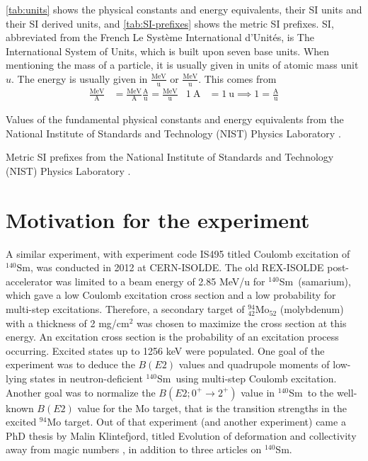 \documentclass[twoside,english]{uiofysmaster/uiofysmaster}
\newcommand{\Sm}{$^{140}$Sm} %
\let\orgautoref\autoref
\renewcommand{\autoref}
        {%
		 \def\sectionautorefname{Section}%
		 \def\subsectionautorefname{Section}%
		 \def\subsubsectionautorefname{Section}%
		 \def\chapterautorefname{Chapter}%
          \orgautoref}
\begin{document}
\autoref{tab:units} shows the physical constants and energy equivalents, their SI units and their SI derived units, and
\autoref{tab:SI-prefixes} shows the metric SI prefixes.
SI, abbreviated from the French Le Syst{\`{e}}me International d'Unit{\'{e}}s, is The International System of Units, which is built upon seven base units.
When mentioning the mass of a particle, it is usually given in units of atomic mass unit $u$.
The energy is usually given in $\frac{\text{MeV}}{\text{u}}$ or $\frac{\text{MeV}}{\text{u}}$.
This comes from 
\begin{align}
	\frac{\text{MeV}}{\text{A}} &= \frac{\text{MeV}}{\text{A}}  \frac{\text{A}}{\text{u}} = \frac{\text{MeV}}{\text{u}}  &  1 ~\text{A} &= 1 ~\text{u} \implies 1 = \frac{\text{A}}{\text{u}}
\end{align}

\begin{table}[htb] 
    \centering 
    \caption{Values of the fundamental physical constants and energy equivalents from the National Institute of Standards and Technology (NIST) Physics Laboratory \cite{units}.}
	
	\label{tab:units}
\end{table}

\begin{table}[htb] 
    \centering 
    \caption{Metric SI prefixes from the National Institute of Standards and Technology (NIST) Physics Laboratory \cite{units}.}
	
	\label{tab:SI-prefixes}
\end{table}


\section{Motivation for the experiment}

A similar experiment, with experiment code IS495 titled Coulomb excitation of \Sm, was conducted in 2012 at CERN-ISOLDE.
The old REX-ISOLDE post-accelerator was limited to a beam energy of 2.85 MeV/u for \Sm\ (samarium), which gave a low Coulomb excitation cross section and a low probability for multi-step excitations. 
Therefore, a secondary target of $^{94}_{42}$Mo$_{52}$ (molybdenum) with a thickness of 2 mg/cm$^2$ was chosen to maximize the cross section at this energy.
An excitation cross section is the probability of an excitation process occurring.
Excited states up to 1256 keV were populated.
One goal of the experiment was to deduce the $B(E2)$ values and quadrupole moments of low-lying states in neutron-deficient \Sm\ using multi-step Coulomb excitation.
Another goal was to normalize the $B(E2; 0^+ \rightarrow 2^+)$ value in \Sm\ to the well-known $B(E2)$ value for the Mo target, that is the transition strengths in the excited $^{94}$Mo target.
Out of that experiment (and another experiment) came a PhD thesis by Malin Klintefjord, titled Evolution of deformation and collectivity away from magic numbers \cite{Klintefjord}, in addition to three articles \cite{Klintefjord2015, Samorajczyk2015, Klintefjord2016} on \Sm.
\end{document}
